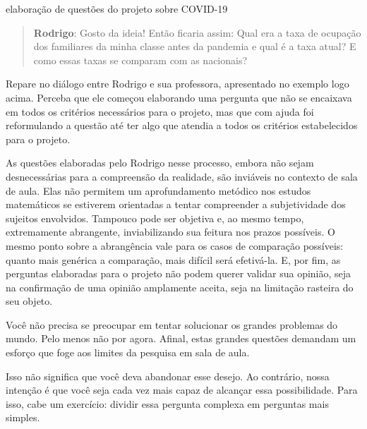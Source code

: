 \begin{task}{elaboração de questões do projeto sobre COVID-19}
\begin{quote}
\textbf{Rodrigo}: Gosto da ideia! Então ficaria assim: Qual era a taxa de ocupação dos familiares da minha classe antes da pandemia e qual é a taxa atual? E como essas taxas se comparam com as nacionais?

\end{quote}

Repare no diálogo entre Rodrigo e sua professora, apresentado no exemplo logo acima. Perceba que ele começou elaborando uma pergunta que não se encaixava em todos os critérios necessários para o projeto, mas que com ajuda foi reformulando a questão até ter algo que atendia a todos os critérios estabelecidos para o projeto.

As questões elaboradas pelo Rodrigo nesse processo, embora não sejam desnecessárias para a compreensão da realidade, são inviáveis no contexto de sala de aula. Elas não permitem um aprofundamento metódico nos estudos matemáticos se estiverem orientadas a tentar compreender a subjetividade dos sujeitos envolvidos. Tampouco pode ser objetiva e, ao mesmo tempo, extremamente abrangente, inviabilizando sua feitura nos prazos possíveis. O mesmo ponto sobre a abrangência vale para os casos de comparação possíveis: quanto mais genérica a comparação, mais difícil será efetivá-la. E, por fim, as perguntas elaboradas para o projeto não podem querer validar sua opinião, seja na confirmação de uma opinião amplamente aceita, seja na limitação rasteira do seu objeto.

Você não precisa se preocupar em tentar solucionar os grandes problemas do mundo. Pelo menos não por agora. Afinal, estas grandes questões demandam um esforço que foge aos limites da pesquisa em sala de aula.

Isso não significa que você deva abandonar esse desejo. Ao contrário, nossa intenção é que você seja cada vez mais capaz de alcançar essa possibilidade. Para isso, cabe um exercício: dividir essa pergunta complexa em perguntas mais simples.

\end{task}

